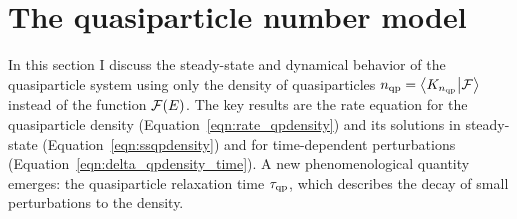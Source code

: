 \section{The quasiparticle number model}
\label{sec:theory.qpnumber}

In this section I discuss the steady-state and dynamical behavior of the quasiparticle system using only the density of quasiparticles
$n_{\mathrm{qp}} = \braket{K_{n_{\mathrm{qp}}}}{\mathcal{F}}$ instead of the function $\mathcal{F}(E)$.
The key results are the rate equation for the quasiparticle density (Equation~\ref{eqn:rate_qpdensity}) and its solutions in steady-state (Equation~\ref{eqn:ssqpdensity}) and for time-dependent perturbations (Equation~\ref{eqn:delta_qpdensity_time}).
A new phenomenological quantity emerges: the quasiparticle relaxation time $\tau_{\mathrm{qp}}$, which describes the decay of small perturbations to the density.

